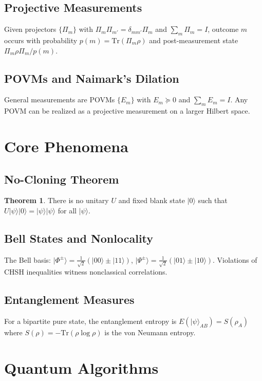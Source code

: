 \documentclass[11pt]{article}
\theoremstyle{definition}
\newtheorem{theorem}{Theorem}[section]
\newcommand{\ket}[1]{\lvert #1 \rangle}
\newcommand{\Tr}{\mathrm{Tr}}
\begin{document}
\subsection{Projective Measurements}
Given projectors $\{\Pi_m\}$ with $\Pi_m\Pi_{m'}=\delta_{mm'}\Pi_m$ and $\sum_m \Pi_m=I$, outcome $m$ occurs with probability $p(m)=\Tr(\Pi_m\rho)$ and post-measurement state $\Pi_m\rho\Pi_m/p(m)$.

\subsection{POVMs and Naimark's Dilation}
General measurements are POVMs $\{E_m\}$ with $E_m \succeq 0$ and $\sum_m E_m=I$. Any POVM can be realized as a projective measurement on a larger Hilbert space.

\section{Core Phenomena}

\subsection{No-Cloning Theorem}
\begin{theorem}
There is no unitary $U$ and fixed blank state $\ket{0}$ such that $U\ket{\psi}\ket{0}=\ket{\psi}\ket{\psi}$ for all $\ket{\psi}$.
\end{theorem}

\subsection{Bell States and Nonlocality}
The Bell basis: $\ket{\Phi^{\pm}}=\tfrac{1}{\sqrt{2}}(\ket{00}\pm\ket{11})$, $\ket{\Psi^{\pm}}=\tfrac{1}{\sqrt{2}}(\ket{01}\pm\ket{10})$. Violations of CHSH inequalities witness nonclassical correlations.

\subsection{Entanglement Measures}
For a bipartite pure state, the entanglement entropy is $E(\ket{\psi}_{AB})=S(\rho_A)$ where $S(\rho)=-\Tr(\rho\log\rho)$ is the von Neumann entropy.

\section{Quantum Algorithms}
\end{document}
